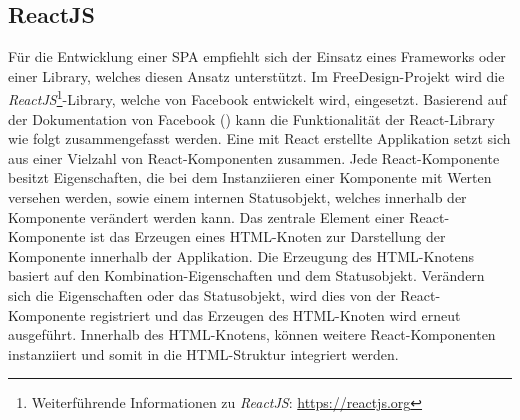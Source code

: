 \subsection{ReactJS}
Für die Entwicklung einer SPA empfiehlt sich der Einsatz eines Frameworks oder einer Library, welches diesen Ansatz unterstützt. Im FreeDesign-Projekt wird die \emph{ReactJS}\footnote{Weiterführende Informationen zu \emph{ReactJS}: \url{https://reactjs.org}}-Library, welche von Facebook entwickelt wird, eingesetzt.
Basierend auf der Dokumentation von Facebook (\cite{Facebook:React}) kann die Funktionalität der React-Library wie folgt zusammengefasst werden.
Eine mit React erstellte Applikation setzt sich aus einer Vielzahl von React-Komponenten zusammen. Jede React-Komponente besitzt Eigenschaften, die bei dem Instanziieren einer Komponente mit Werten versehen werden, sowie einem internen Statusobjekt, welches innerhalb der Komponente verändert werden kann. 
Das zentrale Element einer React-Komponente ist das Erzeugen eines HTML-Knoten zur Darstellung der Komponente innerhalb der Applikation. Die Erzeugung des HTML-Knotens basiert auf den Kombination-Eigenschaften und dem Statusobjekt.
Verändern sich die Eigenschaften oder das Statusobjekt, wird dies von der React-Komponente registriert und das Erzeugen des HTML-Knoten wird erneut ausgeführt. Innerhalb des HTML-Knotens, können weitere React-Komponenten instanziiert und somit in die HTML-Struktur integriert werden.

